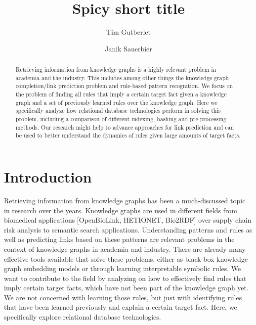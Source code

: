 \documentclass[runningheads]{llncs}
\begin{document}
%
\title{Spicy short title}
%
%
\author{Tim Gutberlet \and Janik Sauerbier}
%
%
%
\maketitle              %
%
\begin{abstract}
Retrieving information from knowledge graphs is a highly relevant problem in academia and the industry. This includes among other things the knowledge graph completion/link prediction problem and rule-based pattern recognition. We focus on the problem of finding all rules that imply a certain target fact given a knowledge graph and a set of previously learned rules over the knowledge graph. Here we specifically analyze how relational database technologies perform in solving this problem, including a comparison of different indexing, hashing and pre-processing methods. Our research might help to advance approaches for link prediction and can be used to better understand the dynamics of rules given large amounts of target facts.

\end{abstract}
%
%
%
\section{Introduction}
Retrieving information from knowledge graphs has been a much-discussed topic in research over the years. Knowledge graphs are used in different fields from biomedical applications [OpenBioLink, HETIONET, Bio2RDF] over supply chain risk analysis to semantic search applications. Understanding patterns and rules as well as predicting links based on these patterns are relevant problems in the context of knowledge graphs in academia and industry. There are already many effective tools available that solve these problems, either as black box knowledge graph embedding models or through learning interpretable symbolic rules. We want to contribute to the field by analyzing on how to effectively find rules that imply certain target facts, which have not been part of the knowledge graph yet. We are not concerned with learning those rules, but just with identifying rules that have been learned previously and explain a certain target fact. Here, we specifically explore relational database technologies. 
\end{document}
